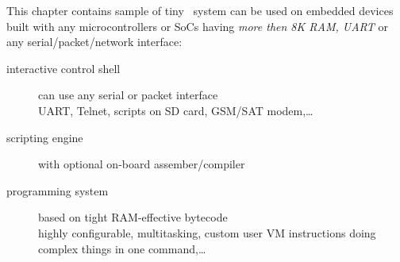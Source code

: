 \clearpage{}\secdown\label{micro}

This chapter contains sample of tiny \F\ system can be used on embedded
devices built with any microcontrollers or SoCs having \emph{more then 8K RAM,
UART} or any serial/packet/network interface:
\begin{description}
\item[interactive control shell] can use any serial or packet interface\\
UART, Telnet, scripts on SD card, GSM/SAT modem,\ldots
\item[scripting engine] with optional on-board assember/compiler
\item[programming system] based on tight RAM-effective bytecode\\
highly configurable, multitasking, custom user VM instructions doing complex
things in one command,\ldots
\end{description}







\secup
